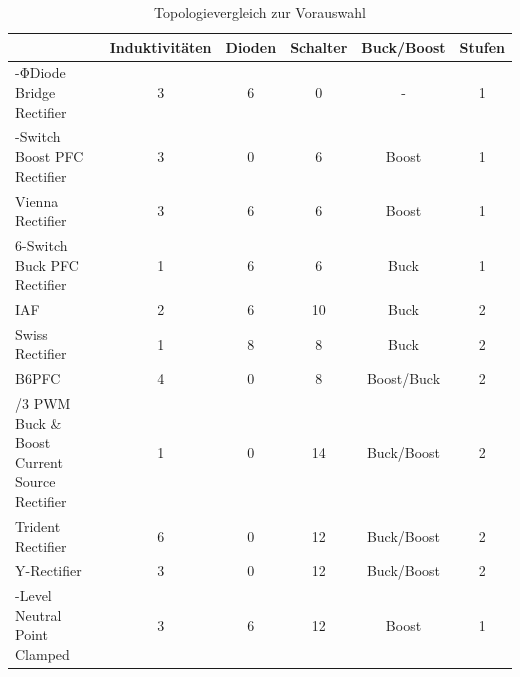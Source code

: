 \begin{table}
	\caption{Topologievergleich zur Vorauswahl}
	\label{tab:vorauswahl}
\begin{tabular}{|>{\centering\arraybackslash}p{3cm}|c|c|c|c|c|} %
	& Induktivitäten & Dioden & Schalter & Buck/Boost & Stufen \\
	\hline
	3-ΦDiode Bridge Rectifier & \cellcolor{yellow!25}3 &\cellcolor{red!25}6 &\cellcolor{green!25} 0 & \cellcolor{red!25}- & \cellcolor{green!25}1 \\
	\hline
	6-Switch Boost PFC Rectifier & \cellcolor{yellow!25}3 &\cellcolor{green!25} 0 & \cellcolor{green!25}6 & \cellcolor{red!25}Boost & \cellcolor{green!25}1 \\
	\hline
	Vienna Rectifier & \cellcolor{yellow!25}3 &\cellcolor{red!25}6 & \cellcolor{green!25}6 & \cellcolor{red!25}Boost & \cellcolor{green!25}1 \\
	\hline
	\cellcolor{green!10}6-Switch Buck PFC Rectifier & \cellcolor{green!25}1 &\cellcolor{red!25}6 &\cellcolor{green!25} 6 & \cellcolor{green!25}Buck & \cellcolor{green!25}1 \\
	\hline
	\cellcolor{green!10} \gls{IAF} & \cellcolor{green!25} 2 &\cellcolor{red!25}6 & \cellcolor{yellow!25}10 & \cellcolor{green!25}Buck & \cellcolor{red!25}2 \\
	\hline
	\cellcolor{green!10}Swiss Rectifier & \cellcolor{green!25}1 &\cellcolor{red!25}8 &\cellcolor{green!25} 8 & \cellcolor{green!25} Buck & \cellcolor{red!25}2 \\
	\hline
	\cellcolor{green!10} \gls{B6PFC} &\cellcolor{yellow!25}4 & \cellcolor{green!25} 0 &\cellcolor{green!25} 8 &\cellcolor{green!25} Boost/Buck & \cellcolor{red!25}2 \\
	\hline
	2/3 PWM Buck \& Boost Current Source Rectifier & \cellcolor{green!25} 1 & \cellcolor{green!25}0 & \cellcolor{yellow!25}14 & \cellcolor{green!25}Buck/Boost & \cellcolor{red!25}2 \\
	\hline
	Trident Rectifier & \cellcolor{red!25}6 &\cellcolor{green!25}0 & \cellcolor{yellow!25}12 & \cellcolor{green!25}Buck/Boost & \cellcolor{red!25}2 \\
	\hline
	Y-Rectifier & \cellcolor{yellow!25}3 &\cellcolor{green!25}0 & \cellcolor{yellow!25}12 &\cellcolor{green!25} Buck/Boost & \cellcolor{red!25}2 \\
	\hline
	3-Level Neutral Point Clamped & \cellcolor{yellow!25}3 &\cellcolor{red!25}6 & \cellcolor{yellow!25}12 & \cellcolor{red!25}Boost & \cellcolor{green!25}1 \\

\end{tabular}
\end{table}
